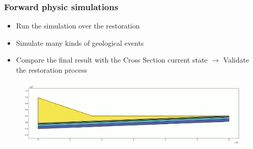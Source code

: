 \documentclass{beamer}
\begin{document}
    \begin{frame}
	\frametitle{Forward physic simulations}
	\begin{itemize}
	\item Run the simulation over the restoration
	\item Simulate many kinds of geological events
	\item Compare the final result with the Cross Section current state $\longrightarrow$ Validate the restoration process
	\end{itemize}
	
	\begin{figure}[H]
	\centering
	\href{slamtec.mp4}{\includegraphics[scale=0.25]{slamim.png}}
	\end{figure}
    \end{frame}
    
\end{document}
